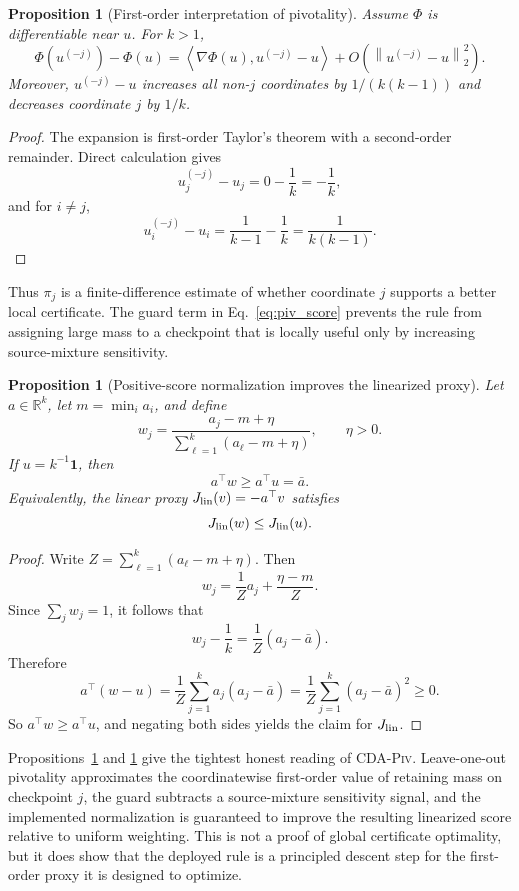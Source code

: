 \documentclass{article}
\newtheorem{proposition}[theorem]{Proposition}
\theoremstyle{definition}
\newcommand{\RR}{\mathbb{R}}
\newcommand{\one}{\mathbf{1}}
\newcommand{\piv}{\textup{\textsc{CDA-Piv}}}
\newcommand{\norm}[1]{\left\lVert #1 \right\rVert}
\newcommand{\inner}[2]{\left\langle #1, #2 \right\rangle}
\newcommand{\paren}[1]{\left( #1 \right)}
\begin{document}
\begin{proposition}[First-order interpretation of pivotality]
\label{prop:piv_taylor}
Assume \(\Phi\) is differentiable near \(u\). For \(k>1\),
\begin{equation}
\Phi(u^{(-j)})-\Phi(u)
=
\inner{\nabla\Phi(u)}{u^{(-j)}-u}
+O\paren{\norm{u^{(-j)}-u}_2^2}.
\label{eq:piv_taylor}
\end{equation}
Moreover, \(u^{(-j)}-u\) increases all non-\(j\) coordinates by \(1/(k(k-1))\) and decreases coordinate \(j\) by \(1/k\).
\end{proposition}

\begin{proof}
The expansion is first-order Taylor's theorem with a second-order remainder. Direct calculation gives
\[
u^{(-j)}_j-u_j=0-\frac{1}{k}=-\frac{1}{k},
\]
and for \(i\ne j\),
\[
u^{(-j)}_i-u_i=\frac{1}{k-1}-\frac{1}{k}=\frac{1}{k(k-1)}.
\]
\end{proof}

Thus \(\pi_j\) is a finite-difference estimate of whether coordinate \(j\) supports a better local certificate. The guard term in Eq.~\eqref{eq:piv_score} prevents the rule from assigning large mass to a checkpoint that is locally useful only by increasing source-mixture sensitivity.

\begin{proposition}[Positive-score normalization improves the linearized proxy]
\label{prop:piv_linear_proxy}
Let \(a\in\RR^k\), let \(m=\min_i a_i\), and define
\[
w_j=\frac{a_j-m+\eta}{\sum_{\ell=1}^k(a_\ell-m+\eta)},
\qquad
\eta>0.
\]
If \(u=k^{-1}\one\), then
\[
a^\top w \ge a^\top u = \bar a.
\]
Equivalently, the linear proxy \(J_{\rm lin}(v)=-a^\top v\) satisfies
\[
J_{\rm lin}(w)\le J_{\rm lin}(u).
\]
\end{proposition}

\begin{proof}
Write \(Z=\sum_{\ell=1}^k(a_\ell-m+\eta)\). Then
\[
w_j=\frac{1}{Z}a_j+\frac{\eta-m}{Z}.
\]
Since \(\sum_j w_j=1\), it follows that
\[
w_j-\frac{1}{k}=\frac{1}{Z}(a_j-\bar a).
\]
Therefore
\[
a^\top(w-u)
=
\frac{1}{Z}\sum_{j=1}^k a_j(a_j-\bar a)
=
\frac{1}{Z}\sum_{j=1}^k (a_j-\bar a)^2
\ge 0.
\]
So \(a^\top w\ge a^\top u\), and negating both sides yields the claim for \(J_{\rm lin}\).
\end{proof}

Propositions~\ref{prop:piv_taylor} and \ref{prop:piv_linear_proxy} give the tightest honest reading of \piv{}. Leave-one-out pivotality approximates the coordinatewise first-order value of retaining mass on checkpoint \(j\), the guard subtracts a source-mixture sensitivity signal, and the implemented normalization is guaranteed to improve the resulting linearized score relative to uniform weighting. This is not a proof of global certificate optimality, but it does show that the deployed rule is a principled descent step for the first-order proxy it is designed to optimize.
\end{document}
